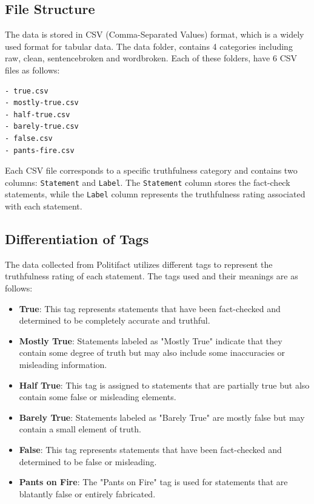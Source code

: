 \documentclass[12pt]{article}
\begin{document}
\subsection{File Structure}

The data is stored in CSV (Comma-Separated Values) format, which is a widely used format for tabular data. The data folder, contains 4 categories including raw, clean, sentencebroken and wordbroken. Each of these folders, have 6 CSV files as follows: 

\begin{verbatim}
- true.csv
- mostly-true.csv
- half-true.csv
- barely-true.csv
- false.csv
- pants-fire.csv
\end{verbatim}

Each CSV file corresponds to a specific truthfulness category and contains two columns: \texttt{Statement} and \texttt{Label}. The \texttt{Statement} column stores the fact-check statements, while the \texttt{Label} column represents the truthfulness rating associated with each statement.

\subsection{Differentiation of Tags}

The data collected from Politifact utilizes different tags to represent the truthfulness rating of each statement. The tags used and their meanings are as follows:

\begin{itemize}
  \item \textbf{True}: This tag represents statements that have been fact-checked and determined to be completely accurate and truthful.
  
  \item \textbf{Mostly True}: Statements labeled as "Mostly True" indicate that they contain some degree of truth but may also include some inaccuracies or misleading information.
  
  \item \textbf{Half True}: This tag is assigned to statements that are partially true but also contain some false or misleading elements.
  
  \item \textbf{Barely True}: Statements labeled as "Barely True" are mostly false but may contain a small element of truth.
  
  \item \textbf{False}: This tag represents statements that have been fact-checked and determined to be false or misleading.
  
  \item \textbf{Pants on Fire}: The "Pants on Fire" tag is used for statements that are blatantly false or entirely fabricated.
\end{itemize}
\end{document}
